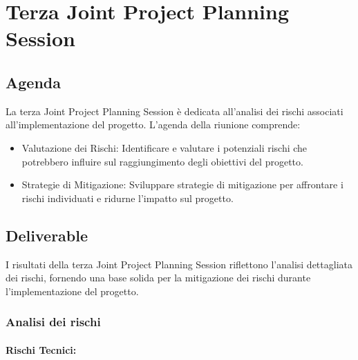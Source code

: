\section{Terza Joint Project Planning Session}

\subsection{Agenda}

La terza Joint Project Planning Session è dedicata all'analisi dei rischi associati all'implementazione del progetto. L'agenda della riunione comprende:

\begin{itemize}
    \item Valutazione dei Rischi: Identificare e valutare i potenziali rischi che potrebbero influire sul raggiungimento degli obiettivi del progetto.
    \item Strategie di Mitigazione: Sviluppare strategie di mitigazione per affrontare i rischi individuati e ridurne l'impatto sul progetto.
\end{itemize}

\subsection{Deliverable}

I risultati della terza Joint Project Planning Session riflettono l'analisi dettagliata dei rischi, fornendo una base solida per la mitigazione dei rischi durante l'implementazione del progetto.

\subsubsection{Analisi dei rischi}

\paragraph{Rischi Tecnici:}

